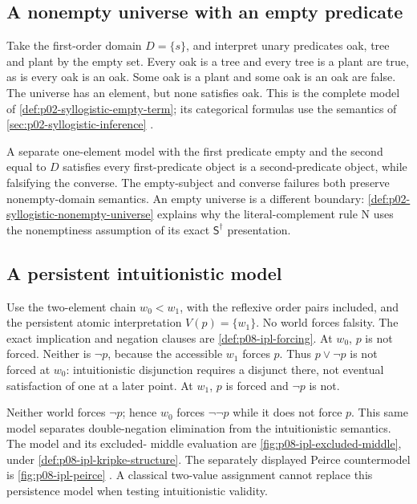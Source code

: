 \subsection{A nonempty universe with an empty predicate}
\label{sec:p14-counter-empty-predicate}

Take the first-order domain \(D=\{s\}\), and interpret unary predicates
oak, tree and plant by the empty set. Every oak is a tree and every tree
is a plant are true, as is every oak is an oak. Some oak is a plant and
some oak is an oak are false. The universe has an element, but none
satisfies oak. This is the complete model of
\cref{def:p02-syllogistic-empty-term}; its categorical formulas use the
semantics of \cref{sec:p02-syllogistic-inference}
\cite[sec.~3]{PrattHartmannMoss2008SyllogisticV1}.

A separate one-element model with the first predicate empty and the second
equal to \(D\) satisfies every first-predicate object is a second-predicate
object, while falsifying the converse. The empty-subject and converse
failures both preserve nonempty-domain semantics. An empty universe is a
different boundary: \cref{def:p02-syllogistic-nonempty-universe} explains
why the literal-complement rule N uses the nonemptiness assumption of
its exact \(\mathsf S^\dagger\) presentation.

\subsection{A persistent intuitionistic model}
\label{sec:p14-counter-ipl}

Use the two-element chain \(w_0<w_1\), with the reflexive order pairs
included, and the persistent atomic interpretation \(V(p)=\{w_1\}\).
No world forces falsity. The exact implication and negation clauses are
\cref{def:p08-ipl-forcing}. At \(w_0\), \(p\) is not forced. Neither
is \(\neg p\), because the accessible \(w_1\) forces \(p\).
Thus \(p\lor\neg p\) is not forced at \(w_0\): intuitionistic
disjunction requires a disjunct there, not eventual satisfaction of one
at a later point. At \(w_1\), \(p\) is forced and \(\neg p\) is not.

Neither world forces \(\neg p\); hence \(w_0\) forces \(\neg\neg p\)
while it does not force \(p\). This same model separates double-negation
elimination from the intuitionistic semantics. The model and its excluded-
middle evaluation are \cref{fig:p08-ipl-excluded-middle}, under
\cref{def:p08-ipl-kripke-structure}. The separately displayed Peirce
countermodel is \cref{fig:p08-ipl-peirce}
\cite{Kripke1965,TroelstraVanDalen1988}. A classical two-value assignment
cannot replace this persistence model when testing intuitionistic validity.

